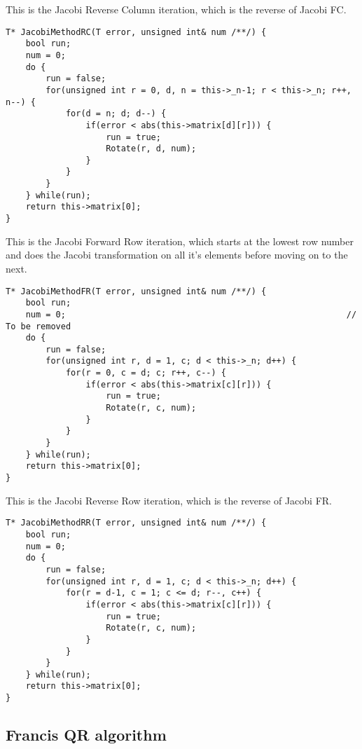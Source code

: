 \documentclass[11pt,english,a4paper]{article}
\begin{document}
\begin{flushleft}

This is the Jacobi Reverse Column iteration, which is the reverse of Jacobi FC.

\begin{lstlisting}[title={\texttt{Matrix<MatrixType::Symmetric, T>::JacobiMethodRC}}]
T* JacobiMethodRC(T error, unsigned int& num /**/) {
	bool run;
	num = 0;
	do {
		run = false;
		for(unsigned int r = 0, d, n = this->_n-1; r < this->_n; r++, n--) {
			for(d = n; d; d--) {
				if(error < abs(this->matrix[d][r])) {
					run = true;
					Rotate(r, d, num);
				}
			}
		}
	} while(run);
	return this->matrix[0];
}
\end{lstlisting}


This is the Jacobi Forward Row iteration, which starts at the lowest row number and does the Jacobi transformation on all it's elements before moving on to the next.

\begin{lstlisting}[title={\texttt{Matrix<MatrixType::Symmetric, T>::JacobiMethodFR}}]
T* JacobiMethodFR(T error, unsigned int& num /**/) {
	bool run;
	num = 0;                                                        // To be removed
	do {
		run = false;
		for(unsigned int r, d = 1, c; d < this->_n; d++) {
			for(r = 0, c = d; c; r++, c--) {
				if(error < abs(this->matrix[c][r])) {
					run = true;
					Rotate(r, c, num);
				}
			}
		}
	} while(run);
	return this->matrix[0];
}
\end{lstlisting}


This is the Jacobi Reverse Row iteration, which is the reverse of Jacobi FR.

\begin{lstlisting}[title={\texttt{Matrix<MatrixType::Symmetric, T>::JacobiMethodRR}}]
T* JacobiMethodRR(T error, unsigned int& num /**/) {
	bool run;
	num = 0;
	do {
		run = false;
		for(unsigned int r, d = 1, c; d < this->_n; d++) {
			for(r = d-1, c = 1; c <= d; r--, c++) {
				if(error < abs(this->matrix[c][r])) {
					run = true;
					Rotate(r, c, num);
				}
			}
		}
	} while(run);
	return this->matrix[0];
}
\end{lstlisting}

\subsection{Francis QR algorithm}


\end{flushleft}
\end{document}
